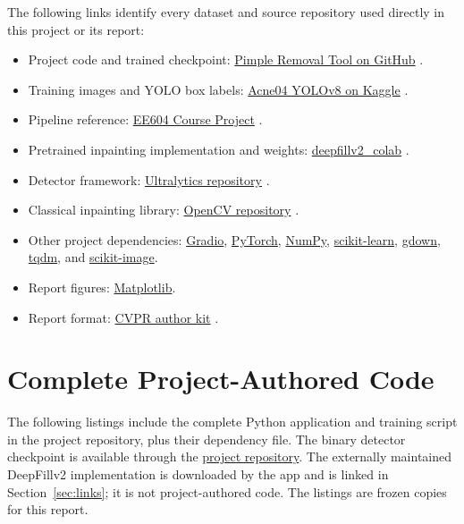 \documentclass[10pt,twocolumn,letterpaper]{article}
\begin{document}
The following links identify every dataset and source repository
used directly in this project or its report:
\begin{itemize}
    \item Project code and trained checkpoint:
    \href{https://github.com/blackleg-sanji007/pimple-removal-tool/tree/main}{Pimple Removal Tool on GitHub}
    \cite{projectrepo}.
    \item Training images and YOLO box labels:
    \href{https://www.kaggle.com/datasets/shreyash1110/acne04-yolov8}{Acne04 YOLOv8 on Kaggle}
    \cite{acne04}.
    \item Pipeline reference:
    \href{https://github.com/architk22/EE604-Course-Project}{EE604 Course Project}
    \cite{architrepo}.
    \item Pretrained inpainting implementation and weights:
    \href{https://github.com/vrindaprabhu/deepfillv2_colab}{deepfillv2\_colab}
    \cite{deepfillrepo}.
    \item Detector framework:
    \href{https://github.com/ultralytics/ultralytics}{Ultralytics repository}
    \cite{ultralytics}.
    \item Classical inpainting library:
    \href{https://github.com/opencv/opencv}{OpenCV repository}
    \cite{opencvdocs}.
    \item Other project dependencies:
    \href{https://github.com/gradio-app/gradio}{Gradio},
    \href{https://github.com/pytorch/pytorch}{PyTorch},
    \href{https://github.com/numpy/numpy}{NumPy},
    \href{https://github.com/scikit-learn/scikit-learn}{scikit-learn},
    \href{https://github.com/wkentaro/gdown}{gdown},
    \href{https://github.com/tqdm/tqdm}{tqdm}, and
    \href{https://github.com/scikit-image/scikit-image}{scikit-image}.
    \item Report figures:
    \href{https://github.com/matplotlib/matplotlib}{Matplotlib}.
    \item Report format:
    \href{https://github.com/cvpr-org/author-kit}{CVPR author kit}
    \cite{cvprkit}.
\end{itemize}

{\small


}

\clearpage
\appendix
\onecolumn
\section{Complete Project-Authored Code}
\label{app:code}

The following listings include the complete Python application and
training script in the project repository, plus their dependency
file. The binary detector checkpoint is available through the
\href{https://github.com/blackleg-sanji007/pimple-removal-tool/tree/main/models}{project repository}.
The externally maintained DeepFillv2 implementation is downloaded
by the app and is linked in Section~\ref{sec:links}; it is not
project-authored code. The listings are frozen copies for this report.
\end{document}
